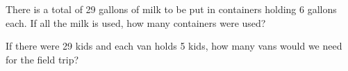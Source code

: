  
\begin{prob}
There is a total of 29 gallons of milk to be put in containers holding
6 gallons each.  If all the milk is used, how many containers were
used?
\end{prob}
 
\begin{prob}
If there were 29 kids and each van holds 5 kids, how many vans would
we need for the field trip?
\end{prob}









